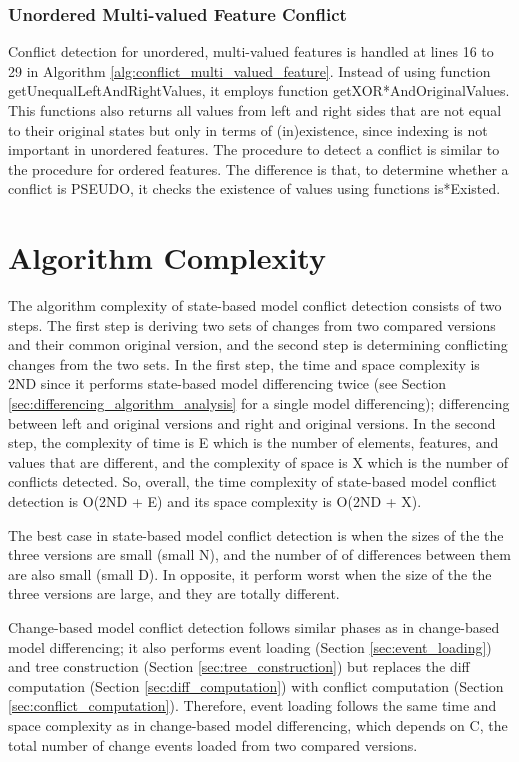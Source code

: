 \subsubsection{Unordered Multi-valued Feature Conflict}
\label{sec:unordered_conflict}
Conflict detection for unordered, multi-valued features is handled at lines 16 to 29 in Algorithm \ref{alg:conflict_multi_valued_feature}. Instead of using function \textsf{getUnequalLeftAndRightValues}, it employs function \textsf{getXOR*AndOriginalValues}. This functions also returns all values from left and right sides that are not equal to their original states but only in terms of (in)existence, since indexing is not important in unordered features. The procedure to detect a conflict is similar to the procedure for ordered features. The difference is that, to determine whether a conflict is \textsf{PSEUDO}, it checks the existence of values using functions \textsf{is*Existed}.

\section{Algorithm Complexity}
\label{sec:conflict_algorithm_complexity}
The algorithm complexity of state-based model conflict detection consists of two steps. The first step is deriving two sets of changes from two compared versions and their common original version, and the second step is determining conflicting changes from the two sets. In the first step, the time and space complexity is \textsf{2ND} since it performs state-based model differencing  twice (see Section \ref{sec:differencing_algorithm_analysis} for a single model differencing); differencing between left and original versions and right and original versions. In the second step, the complexity of time is \textsf{E} which is the number of elements, features, and values that are different, and the complexity of space is \textsf{X} which is the number of conflicts detected. So, overall, the time complexity of state-based model conflict detection is \textsf{O}(\textsf{2ND} + \textsf{E}) and its space complexity is \textsf{O}(\textsf{2ND} + \textsf{X)}.

The best case in state-based model conflict detection is when the sizes of the the three versions are small (small \textsf{N}), and the number of of differences between them are also small (small \textsf{D}). In opposite, it perform worst when the size of the the three versions are large, and they are totally different. 

Change-based model conflict detection follows similar phases as in change-based model differencing; it also performs event loading (Section \ref{sec:event_loading}) and tree construction (Section \ref{sec:tree_construction}) but replaces the diff computation (Section \ref{sec:diff_computation}) with conflict computation (Section \ref{sec:conflict_computation}). Therefore, event loading follows the same time and space complexity as in change-based model differencing, which depends on \textsf{C}, the total number of change events loaded from two compared versions. 

